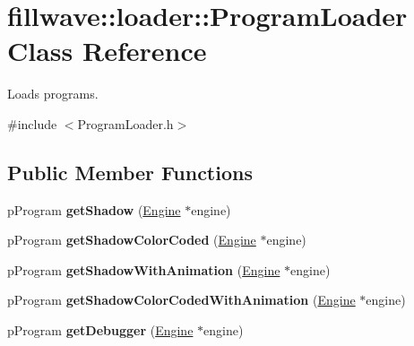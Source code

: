 \hypertarget{classfillwave_1_1loader_1_1ProgramLoader}{}\section{fillwave\+:\+:loader\+:\+:Program\+Loader Class Reference}
\label{classfillwave_1_1loader_1_1ProgramLoader}


Loads programs.  




{\ttfamily \#include $<$Program\+Loader.\+h$>$}

\subsection*{Public Member Functions}
\begin{DoxyCompactItemize}
\item 
\hypertarget{classfillwave_1_1loader_1_1ProgramLoader_aaa4fc5b171995e4f106665fd5b268271}{}p\+Program {\bfseries get\+Shadow} (\hyperlink{classfillwave_1_1Engine}{Engine} $\ast$engine)\label{classfillwave_1_1loader_1_1ProgramLoader_aaa4fc5b171995e4f106665fd5b268271}

\item 
\hypertarget{classfillwave_1_1loader_1_1ProgramLoader_a38fb18ebedf5d9fe97b7afa8e23c7654}{}p\+Program {\bfseries get\+Shadow\+Color\+Coded} (\hyperlink{classfillwave_1_1Engine}{Engine} $\ast$engine)\label{classfillwave_1_1loader_1_1ProgramLoader_a38fb18ebedf5d9fe97b7afa8e23c7654}

\item 
\hypertarget{classfillwave_1_1loader_1_1ProgramLoader_a32d6c2430328ae4dd149c297572460d4}{}p\+Program {\bfseries get\+Shadow\+With\+Animation} (\hyperlink{classfillwave_1_1Engine}{Engine} $\ast$engine)\label{classfillwave_1_1loader_1_1ProgramLoader_a32d6c2430328ae4dd149c297572460d4}

\item 
\hypertarget{classfillwave_1_1loader_1_1ProgramLoader_ac57d671d33a0f300245b62474edf8582}{}p\+Program {\bfseries get\+Shadow\+Color\+Coded\+With\+Animation} (\hyperlink{classfillwave_1_1Engine}{Engine} $\ast$engine)\label{classfillwave_1_1loader_1_1ProgramLoader_ac57d671d33a0f300245b62474edf8582}

\item 
\hypertarget{classfillwave_1_1loader_1_1ProgramLoader_abb075ffde8d38327a52f19c97a92426c}{}p\+Program {\bfseries get\+Debugger} (\hyperlink{classfillwave_1_1Engine}{Engine} $\ast$engine)\label{classfillwave_1_1loader_1_1ProgramLoader_abb075ffde8d38327a52f19c97a92426c}


\end{DoxyCompactItemize}
